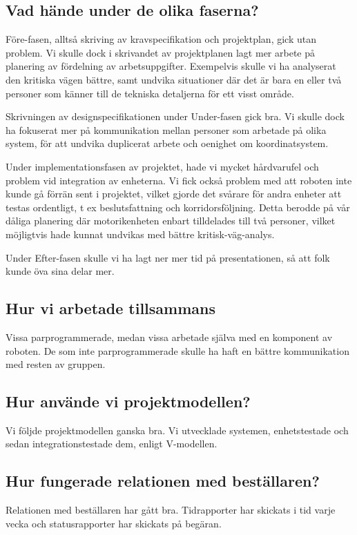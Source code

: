 \documentclass[a4paper,titlepage,12pt]{article}
\begin{document}
	\subsection{Vad hände under de olika faserna?}

    Före-fasen, alltså skriving av kravspecifikation och projektplan, gick utan
    problem. Vi skulle dock i skrivandet av projektplanen lagt mer arbete på
    planering av fördelning av arbetsuppgifter. Exempelvis skulle vi ha
    analyserat den kritiska vägen bättre, samt undvika situationer där det är
    bara en eller två personer som känner till de tekniska detaljerna för ett
    visst område.

    Skrivningen av designspecifikationen under Under-fasen gick bra. Vi
    skulle dock ha fokuserat mer på kommunikation mellan personer som arbetade på
    olika system, för att undvika duplicerat arbete och oenighet om
    koordinatsystem.

    Under implementationsfasen av projektet, hade vi mycket hårdvarufel och
    problem vid integration av enheterna. Vi fick också problem med att roboten
    inte kunde gå förrän sent i projektet, vilket gjorde det svårare för andra
    enheter att testas ordentligt, t ex beslutsfattning och korridorsföljning.
    Detta berodde på vår dåliga planering där motorikenheten enbart tilldelades
    till två personer, vilket möjligtvis hade kunnat undvikas med bättre
    kritisk-väg-analys.

    Under Efter-fasen skulle vi ha lagt ner mer tid på presentationen, så att
    folk kunde öva sina delar mer.
	
	\subsection{Hur vi arbetade tillsammans}
    Vissa parprogrammerade, medan vissa arbetade själva med en komponent av
    roboten. De som inte parprogrammerade skulle ha haft en bättre
    kommunikation med resten av gruppen.
	
	\subsection{Hur använde vi projektmodellen?}
    Vi följde projektmodellen ganska bra. Vi utvecklade systemen, enhetstestade
    och sedan integrationstestade dem, enligt V-modellen.
	
	\subsection{Hur fungerade relationen med beställaren?}
    Relationen med beställaren har gått bra. Tidrapporter har skickats i tid
    varje vecka och statusrapporter har skickats på begäran. 
	
\end{document}
